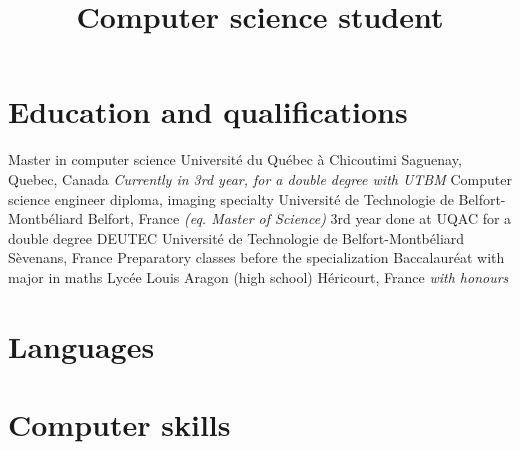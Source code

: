 \documentclass[10pt,a4paper,sans]{moderncv}
\title{Computer science student}
\begin{document}
	\maketitle


	\section{Education and qualifications}
			{Master in computer science}
			{Université du Québec à Chicoutimi}
			{Saguenay, Quebec, Canada}
			{}
			{\textit{Currently in 3rd year, for a double degree with UTBM}}
			{Computer science engineer diploma, imaging specialty}
			{Université de Technologie de Belfort-Montbéliard}
			{Belfort, France}
			{\textit{(eq. Master of Science)}}
			{3rd year done at UQAC for a double degree}
			{DEUTEC}
			{Université de Technologie de Belfort-Montbéliard}
			{Sèvenans, France}
			{}
			{Preparatory classes before the specialization}
			{Baccalauréat with major in maths}
			{Lycée Louis Aragon (high school)}
			{Héricourt, France}
			{\small\textit{with honours}}
			{}


	\vspace*{\deletedSpace}
	\section{Languages}


	\vspace*{\deletedSpace}
	\section{Computer skills}
\end{document}
